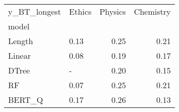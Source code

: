 \begin{tabular}{llrr}
\toprule
y\_BT\_longest & Ethics &  Physics &  Chemistry \\
model  &        &          &            \\
\midrule
Length &   0.13 &     0.25 &       0.21 \\
Linear &   0.08 &     0.19 &       0.17 \\
DTree  &      - &     0.20 &       0.15 \\
RF     &   0.07 &     0.25 &       0.21 \\
BERT\_Q &   0.17 &     0.26 &       0.13 \\
\bottomrule
\end{tabular}
